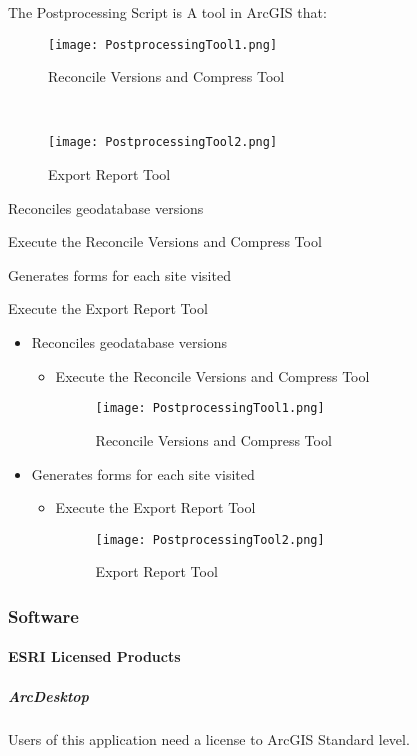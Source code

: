 \documentclass[class=book , crop=false, titlepage, twoside, multi={itemize, figure, verbatim}, float=false]{standalone}
\begin{document}
The Postprocessing Script is A tool in ArcGIS that:
\begin{wrapfigure}{r}{0.5\textwidth}
\centering
\texttt{[image: PostprocessingTool1.png]}
\caption{Reconcile Versions and Compress Tool}
\vspace{.25in}

\HRule \\[.4cm] %
\vspace{.25in}

\texttt{[image: PostprocessingTool2.png]}
\caption{Export Report Tool}
\end{wrapfigure}
Reconciles geodatabase versions
\vspace{1.5in}

Execute the Reconcile Versions and Compress Tool
\vspace{2in}

Generates forms for each site visited
\vspace{1.25in}

Execute the Export Report Tool
\clearpage
%
%
%
\begin{itemize}
\item Reconciles geodatabase versions
\begin{itemize}
\item Execute the Reconcile Versions and Compress Tool
%
%
\begin{figure}[h!]
\centering
    \texttt{[image: PostprocessingTool1.png]}
\caption{Reconcile Versions and Compress Tool}
\end{figure}
\end{itemize}

\item Generates forms for each site visited
\begin{itemize}
\item Execute the Export Report Tool
%
%
\begin{figure}[h!]
\centering
    \texttt{[image: PostprocessingTool2.png]}
\caption{Export Report Tool}
\end{figure}
\end{itemize}
\end{itemize}
\clearpage
%
%
%
\subsubsection{Software}
\paragraph{ESRI Licensed Products}
\subparagraph{ArcDesktop}Users of this application need a license to ArcGIS Standard level.
\end{document}
